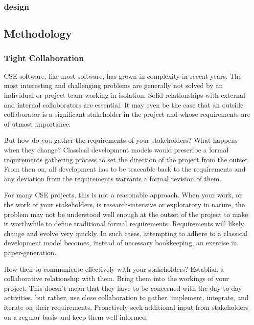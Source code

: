 \documentclass[12pt,relax]{article}
\begin{document}
  \subsubsection{design}

\subsection{Methodology}
  
  \subsubsection{Tight Collaboration}
  
  CSE software, like most software, has grown in complexity in recent years.
  The most interesting and challenging problems are generally not solved by an
  individual or project team working in isolation.  Solid relationships with 
  external and internal collaborators are essential.  It may even be the case
  that an outside collaborator is a significant stakeholder in the project and 
  whose requirements are of utmost importance.
  
  But how do you gather the requirements of your stakeholders?  What happens
  when they change?  Classical development models would prescribe a formal
  requirements gathering process to set the direction of the project from the
  outset.  From then on, all development has to be traceable back to the
  requirements and any deviation from the requirements warrants a formal revision
  of them.  
  
  For many CSE projects, this is not a reasonable approach.  When your work, or 
  the work of your stakeholders, is research-intensive or exploratory in nature, 
  the problem may not be understood well enough at the outset of the project to 
  make it worthwhile to define traditional formal requirements.  Requirements 
  will likely change and evolve very quickly.  In such cases, attempting to
  adhere to a classical development model becomes, instead of necessary
  bookkeeping, an exercise in paper-generation.
  
  How then to communicate effectively with your stakeholders?  Establish a
  collaborative relationship with them.  Bring them into the workings of your
  project.  This doesn't mean that they have to be concerned with the day to day
  activities, but rather, use close collaboration to gather, implement,
  integrate, and iterate on their requirements.  Proactively seek additional
  input from stakeholders on a regular basis and keep them well informed.
  
\end{document}
